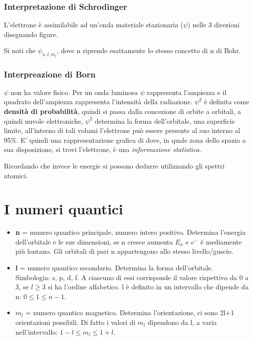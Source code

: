 
\subsubsection{Interpretazione di Schrodinger} 
L'elettrone è assimilabile ad un'onda materiale stazionaria ($\psi$) nelle 3 direzioni disegnando figure. 


Si noti che $\psi_{n,l,m_l}$, dove n riprende esattamente lo stesso concetto di n di Bohr. 

\subsubsection{Interpreazione di Born}
$\psi$ non ha valore fisico. Per un onda luminosa $\psi$ rappresenta l'ampiezza e il quadrato dell'ampiezza rappresenta l'intensità della radiazione. $\psi^{2}$ è definita come \textbf{densità di probabilità}, quindi si passa dalla concezione di orbite a orbitali, a quindi nuvole elettroniche, $\psi^{2}$ determina la forma dell'orbitale, una superficie limite, all'interno di tali volumi l'elettrone può essere presente al suo interno al 95\%. E' quindi una rappresentazione grafica di dove, in quale zona dello spazio a sua disposizione, si trovi l'elettrone, è una \emph{informazione statistica}. 

Ricordando che invece le energie si possono dedurre utilizzando gli spettri atomici. 

\section{I numeri quantici}
\begin{itemize}
    \item \textbf{n} = numero quantico principale, numero intero positivo. Determina l'energia dell'orbitale e le sue dimensioni, se n cresce aumenta $E_n$ e $e^{-}$ è mediamente più lontano. Gli orbitali di pari n appartengono allo stesso livello/guscio. 
    \item \textbf{l} = numero quantico secondario. Determina la forma dell'orbitale. Simbologia: s, p, d, f. A ciascuno di essi corrisponde il valore rispettivo da 0 a 3, se $l\ge3$ si ha l'ordine alfabetico. l è definito in un intervallo che dipende da n: $0\le 1 \le n-1$.
    \item \textbf{$m_l$} = numero quantico magnetico. Determina l'orientazione, ci sono 2l+1 orientazioni possibili. Di fatto i valori di $m_l$ dipendono da l, a varia nell'intervallo: $1-l \le m_l \le 1+l$. 
\end{itemize} 

